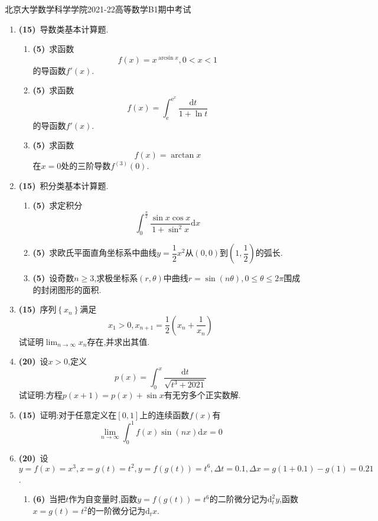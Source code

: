 \documentclass{ctexart}
\newcommand{\e}{\mathrm{e}}
\newcommand{\di}{\mathrm{d}}
\newcommand{\dx}{\di x}
\begin{document}
\pagestyle{empty}
\begin{center}\Large
    北京大学数学科学学院2021-22高等数学B1期中考试
\end{center}
\begin{enumerate}[leftmargin=*,label=\textbf{\arabic*.}]
    \item \textbf{(15)}\ 导数类基本计算题.
        \begin{enumerate}[label=\textbf{(\arabic*)}]
            \item \textbf{(5)}\ 求函数$$f(x)=x^{\arcsin x},0<x<1$$的导函数$f'(x)$.
            \item \textbf{(5)}\ 求函数$$f(x)=\int_{\e}^{\e^x}\dfrac{\di t}{1+\ln t}$$的导函数$f'(x)$.
            \item \textbf{(5)}\ 求函数$$f(x)=\arctan x$$在$x=0$处的三阶导数$f^{(3)}(0)$.
        \end{enumerate}
    \item \textbf{(15)}\ 积分类基本计算题.
        \begin{enumerate}[label=\textbf{(\arabic*)}]
            \item \textbf{(5)}\ 求定积分$$\int_{0}^{\frac{\pi}{2}}{\dfrac{\sin x\cos x}{1+\sin^2x}\dx}$$
            \item \textbf{(5)}\ 求欧氏平面直角坐标系中曲线$y=\dfrac{1}{2}x^2$从$(0,0)$到$\left(1,\dfrac{1}{2}\right)$的弧长.
            \item \textbf{(5)}\ 设奇数$n\geqslant3$,求极坐标系$(r,\theta)$中曲线$r=\sin(n\theta),0\leqslant\theta\leqslant2\pi$围成的封闭图形的面积.
        \end{enumerate}
    \item \textbf{(15)}\ 序列$\left\{x_n\right\}$满足
        $$x_1>0,x_{n+1}=\dfrac{1}{2}\left(x_n+\dfrac{1}{x_n}\right)$$
        试证明$\displaystyle\lim_{n\to\infty}x_n$存在,并求出其值.
    \item \textbf{(20)}\ 设$x>0$,定义$$p(x)=\int_0^x\dfrac{\di t}{\sqrt{t^3+2021}}$$
        试证明:方程$p(x+1)=p(x)+\sin x$有无穷多个正实数解.
    \item \textbf{(15)}\ 证明:对于任意定义在$[0,1]$上的连续函数$f(x)$有$$\lim_{n\to\infty}\int_0^1f(x)\sin(nx)\dx=0$$
    \item \textbf{(20)}\ 设$y=f(x)=x^3,x=g(t)=t^2,y=f(g(t))=t^6,\Delta t=0.1,\Delta x=g(1+0.1)-g(1)=0.21$.
        \begin{enumerate}[label=\textbf{(\arabic*)}]
            \item \textbf{(6)}\ 当把$t$作为自变量时,函数$y=f(g(t))=t^6$的二阶微分记为$\di_t^2y$,函数$x=g(t)=t^2$的一阶微分记为$\di_tx$.

\end{enumerate}
\end{enumerate}
\end{document}
